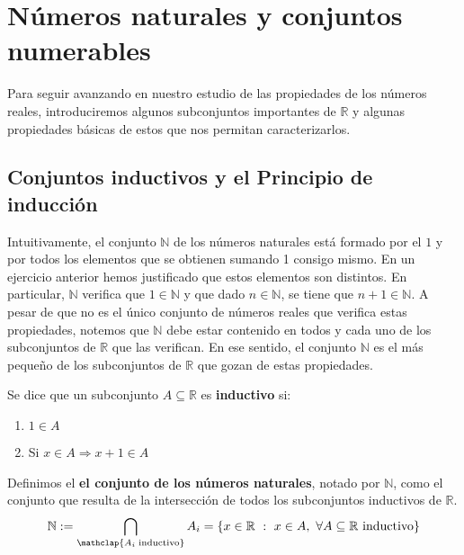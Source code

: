 \chapter{Números naturales y conjuntos numerables}\label{chp:Tema2}
Para seguir avanzando en nuestro estudio de las propiedades de los números reales, introduciremos
algunos subconjuntos importantes de $\mathbb{R}$ y algunas propiedades básicas de estos que nos permitan
caracterizarlos.


\section{Conjuntos inductivos y el Principio de inducción}
Intuitivamente, el conjunto $\mathbb{N}$ de los números naturales está formado por el $1$ y por todos
los elementos que se obtienen sumando 1 consigo mismo. En un ejercicio anterior hemos justificado
que estos elementos son distintos. En particular, $\mathbb{N}$ verifica que $1 \in \mathbb{N}$ y que
dado $n \in \mathbb{N}$, se tiene que $n+1 \in \mathbb{N}$. A pesar de que no es el único conjunto de
números reales que verifica estas propiedades, notemos que $\mathbb{N}$ debe estar contenido en
todos y cada uno de los subconjuntos de $\mathbb{R}$ que las verifican. En ese sentido,
el conjunto $\mathbb{N}$ es el más pequeño de los subconjuntos de $\mathbb{R}$ que gozan de estas propiedades.

\begin{definicion}
    Se dice que un subconjunto $A \subseteq \mathbb{R}$ es \textbf{inductivo} si:
    \begin{enumerate}
        \item $1 \in A$
        \item Si $x \in A \Longrightarrow x+1 \in A$
    \end{enumerate}
\end{definicion}

\begin{definicion}
    Definimos el \textbf{el conjunto de los números naturales}, notado por $\mathbb{N}$, como el conjunto
    que resulta de la intersección de todos los subconjuntos inductivos de $\mathbb{R}$.
    \begin{equation*}
        \mathbb{N} :=
        \bigcap_{\mathclap{A_i\;\text{inductivo}}}A_i
        =\{x \in \mathbb{R}~:~x \in A, ~\forall A \subseteq \mathbb{R} ~\text{inductivo}\}
    \end{equation*} 
\end{definicion}

